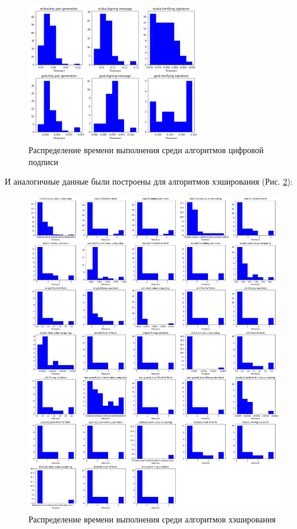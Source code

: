 \begin{figure}[h!]
    \centering
    \includegraphics[width=0.68\textwidth]{./images/hists_dss}
    \caption{Распределение времени выполнения среди алгоритмов цифровой подписи}\label{dss}
\end{figure}

И аналогичные данные были построены для алгоритмов хэширования (Рис. \ref{hash}):

\begin{figure}
    \centering
    \includegraphics[width=\textwidth]{./images/hists_hashing}
    \caption{Распределение времени выполнения среди алгоритмов хэширования}\label{hash}
\end{figure}


